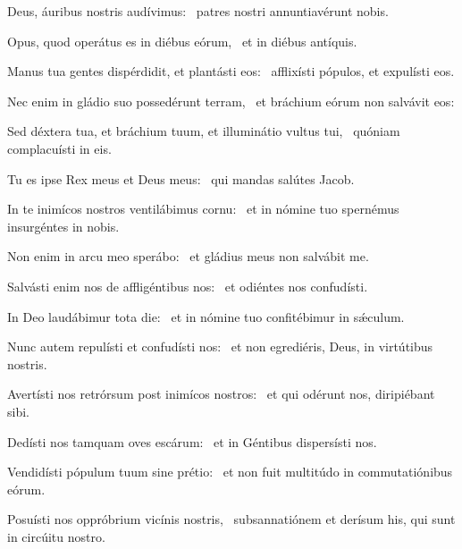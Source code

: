 \item Deus, áuribus nostris audívimus:~\psstar{} patres nostri annuntiavérunt nobis.

\item Opus, quod operátus es in diébus eórum,~\psstar{} et in diébus antíquis.

\item Manus tua gentes dispérdidit, et plantásti eos:~\psstar{} afflixísti pópulos, et expulísti eos.

\item Nec enim in gládio suo possedérunt terram,~\psstar{} et bráchium eórum non salvávit eos:

\item Sed déxtera tua, et bráchium tuum, et illuminátio vultus tui,~\psstar{} quóniam complacuísti in eis.

\item Tu es ipse Rex meus et Deus meus:~\psstar{} qui mandas salútes Jacob.

\item In te inimícos nostros ventilábimus cornu:~\psstar{} et in nómine tuo spernémus insurgéntes in nobis.

\item Non enim in arcu meo sperábo:~\psstar{} et gládius meus non salvábit me.

\item Salvásti enim nos de affligéntibus nos:~\psstar{} et odiéntes nos confudísti.

\item In Deo laudábimur tota die:~\psstar{} et in nómine tuo confitébimur in sǽculum.

\item Nunc autem repulísti et confudísti nos:~\psstar{} et non egrediéris, Deus, in virtútibus nostris.

\item Avertísti nos retrórsum post inimícos nostros:~\psstar{} et qui odérunt nos, diripiébant sibi.

\item Dedísti nos tamquam oves escárum:~\psstar{} et in Géntibus dispersísti nos.

\item Vendidísti pópulum tuum sine prétio:~\psstar{} et non fuit multitúdo in commutatiónibus eórum.

\item Posuísti nos oppróbrium vicínis nostris,~\psstar{} subsannatiónem et derísum his, qui sunt in circúitu nostro.


